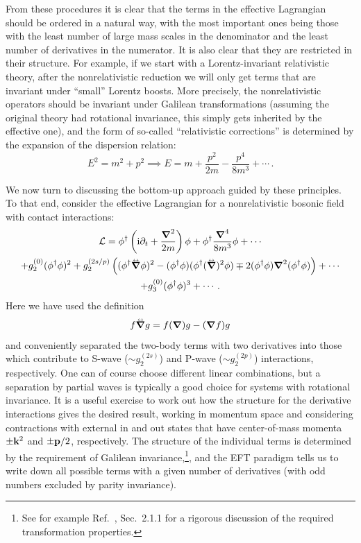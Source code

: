 From these procedures it is clear that the terms in the effective Lagrangian 
should be ordered in a natural way, with the most important ones being those 
with the least number of large mass scales in the denominator and the least 
number of derivatives in the numerator.  It is also clear that they are 
restricted in their structure.  For example, if we start with a 
Lorentz-invariant relativistic theory, after the nonrelativistic reduction we 
will only get terms that are invariant under ``small'' Lorentz boosts.  More 
precisely, the nonrelativistic operators should be invariant under Galilean 
transformations (assuming the original theory had rotational invariance, this 
simply gets inherited by the effective one), and the form of so-called 
``relativistic corrections'' is determined by the expansion of the dispersion 
relation:
%
\begin{equation}
 E^2 = m^2 + p^2
 \implies E = m + \frac{p^2}{2m} - \frac{p^4}{8m^3} + \cdots \,.
\end{equation}

We now turn to discussing the bottom-up approach guided by these principles.  
To that end, consider the effective Lagrangian for a nonrelativistic bosonic 
field with contact interactions:
%
\begin{multline}
 \LL = \phi^\dagger \left(\ii\partial_t + \frac{\Laplace}{2m}\right)\phi
 + \phi^\dagger \frac{\vNabla^4}{8m^3} \phi + \cdots \\
 + g_{2}^{(0)} (\phi^\dagger \phi)^2
 + g_{2}^{(2s/p)} \left(
  (\phi^\dagger\vNablaLR\phi)^2
   - (\phi^\dagger\phi)(\phi^\dagger(\vNablaLR)^2\phi)
   \mp 2 (\phi^\dagger\phi)\vNabla^2(\phi^\dagger\phi)
  \right) + \cdots \\
 + g_{3}^{(0)} (\phi^\dagger \phi)^3 + \cdots \,.
\label{eq:L-phi-generic}
\end{multline}
%
Here we have used the definition
%
\begin{equation}
 f \vNablaLR g = f(\vNabla)g - (\vNabla f)g
\end{equation}
%
and conveniently separated the two-body terms with two derivatives into 
those which contribute to S-wave ($\sim g_{2}^{(2s)}$) and P-wave ($\sim 
g_{2}^{(2p)}$) interactions, respectively.  One can of course choose different 
linear combinations, but a separation by partial waves is typically a good 
choice for systems with rotational invariance.  It is a useful exercise to work 
out how the structure for the derivative interactions gives the desired result, 
working in momentum space and considering contractions with external in and out 
states that have center-of-mass momenta $\pm\mathbf{k}^2$ and $\pm\mathbf{p}/2$, respectively.
The structure of the individual terms is determined by the requirement of 
Galilean invariance,\footnote{See for example Ref.~\cite{Hagen:2014}, 
Sec.~2.1.1 for a rigorous discussion of the required transformation 
properties.}, and the EFT paradigm tells us to write down all possible terms 
with a given number of derivatives (with odd numbers excluded by parity 
invariance).

